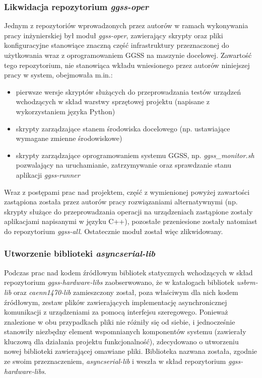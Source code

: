 \subsubsection{Likwidacja repozytorium \emph{ggss-oper}}
Jednym z repozytoriów wprowadzonych przez autorów w ramach wykonywania pracy inżynierskiej był moduł \emph{ggss-oper}, zawierający skrypty oraz pliki konfiguracyjne stanowiące znaczną część infrastruktury przeznaczonej do użytkowania wraz z oprogramowaniem GGSS na maszynie docelowej. Zawartość tego repozytorium, nie stanowiąca wkładu wniesionego przez autorów niniejszej pracy w system, obejmowała m.in.: 
\begin{itemize}
    \item pierwsze wersje skryptów służących do przeprowadzania testów urządzeń wchodzących w skład warstwy sprzętowej projektu (napisane z wykorzystaniem języka Python)
    \item skrypty zarządzające stanem środowiska docelowego (np. ustawiające wymagane zmienne środowiskowe)
    \item skrypty zarządzające oprogramowaniem systemu GGSS, np. \emph{ggss\_monitor.sh} pozwalający na uruchamianie, zatrzymywanie oraz sprawdzanie stanu aplikacji \emph{ggss-runner}
\end{itemize}
Wraz z postępami prac nad projektem, część z wymienionej powyżej zawartości zastąpiona została przez autorów pracy rozwiązaniami alternatywnymi (np. skrypty służące do przeprowadzania operacji na urządzeniach zastąpione zostały aplikacjami napisanymi w języku C++), pozostałe przeniesione zostały natomiast do repozytorium \emph{ggss-all}. Ostatecznie moduł został więc zlikwidowany.


\subsubsection{Utworzenie biblioteki \emph{asyncserial-lib}}
Podczas prac nad kodem źródłowym bibliotek statycznych wchodzących w skład repozytorium \emph{ggss-hardware-libs} zaobserwowano, że w katalogach bibliotek \emph{usbrm-lib} oraz \emph{caenn1470-lib} zamieszczony został, poza właściwym dla nich kodem źródłowym, zestaw plików zawierających implementację asynchronicznej komunikacji z urządzeniami za pomocą interfejsu szeregowego. Ponieważ znalezione w obu przypadkach pliki nie różniły się od siebie, i jednocześnie stanowiły niezbędny element wspomnianych komponentów systemu (zawierały kluczową dla działania projektu funkcjonalność), zdecydowano o utworzeniu nowej biblioteki zawierającej omawiane pliki. Biblioteka nazwana została, zgodnie ze swoim przeznaczeniem, \emph{asyncserial-lib} i weszła w skład repozytorium \emph{ggss-hardware-libs}.


